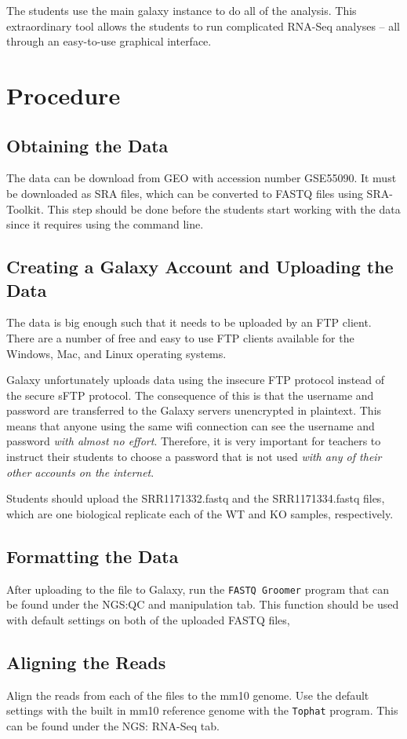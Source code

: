 \documentclass{report}
\begin{document}
The students use the main galaxy instance to do all of the analysis. This extraordinary tool allows the students to run complicated RNA-Seq analyses -- all through an easy-to-use graphical interface.

\section{Procedure}
\subsection{Obtaining the Data}
The data can be download from GEO with accession number GSE55090. It must be downloaded as SRA files, which can be converted to FASTQ files using SRA-Toolkit. This step should be done before the students start working with the data since it requires using the command line.

\subsection{Creating a Galaxy Account and Uploading the Data}
The data is big enough such that it needs to be uploaded by an FTP client. There are a number of free and easy to use FTP clients available for the Windows, Mac, and Linux operating systems. 

Galaxy unfortunately uploads data using the insecure FTP protocol instead of the secure sFTP protocol. The consequence of this is that the username and password are transferred to the Galaxy servers unencrypted in plaintext. This means that anyone using the same wifi connection can see the username and password \emph{with almost no effort}. Therefore, it is very important for teachers to instruct their students to choose a password that is not used \emph{with any of their other accounts on the internet}. 

Students should upload the SRR1171332.fastq and the SRR1171334.fastq files, which are one biological replicate each of the WT and KO samples, respectively.

\subsection{Formatting the Data}
After uploading to the file to Galaxy, run the \texttt{FASTQ Groomer} program that can be found under the NGS:QC and manipulation tab. This function should be used with default settings on both of the uploaded FASTQ files,  

\subsection{Aligning the Reads}
Align the reads from each of the files to the mm10 genome. Use the default settings with the built in mm10 reference genome with the \texttt{Tophat} program. This can be found under the NGS: RNA-Seq tab.
\end{document}
